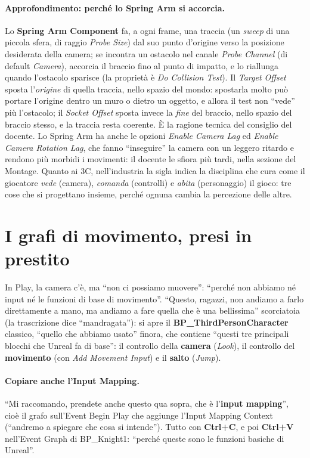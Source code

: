 \paragraph{Approfondimento: perché lo Spring Arm si accorcia.} Lo \textbf{Spring Arm
Component} fa, a ogni frame, una traccia (un \emph{sweep} di una piccola sfera, di
raggio \emph{Probe Size}) dal suo punto d'origine verso la posizione desiderata della
camera; se incontra un ostacolo nel canale \emph{Probe Channel} (di default
\emph{Camera}), accorcia il braccio fino al punto di impatto, e lo riallunga quando
l'ostacolo sparisce (la proprietà è \emph{Do Collision Test}). Il \emph{Target Offset}
sposta l'\emph{origine} di quella traccia, nello spazio del mondo: spostarla molto può
portare l'origine dentro un muro o dietro un oggetto, e allora il test non ``vede'' più
l'ostacolo; il \emph{Socket Offset} sposta invece la \emph{fine} del braccio, nello
spazio del braccio stesso, e la traccia resta coerente. È la ragione tecnica del
consiglio del docente. Lo Spring Arm ha anche le opzioni \emph{Enable Camera Lag} ed
\emph{Enable Camera Rotation Lag}, che fanno ``inseguire'' la camera con un leggero
ritardo e rendono più morbidi i movimenti: il docente le sfiora più tardi, nella sezione
del Montage. Quanto ai 3C, nell'industria la sigla indica la disciplina che cura come il
giocatore \emph{vede} (camera), \emph{comanda} (controlli) e \emph{abita} (personaggio)
il gioco: tre cose che si progettano insieme, perché ognuna cambia la percezione delle
altre.

\section{I grafi di movimento, presi in prestito}
\label{ue9:sec:movimento}

In Play, la camera c'è, ma ``non ci possiamo muovere'': ``perché non abbiamo né input né
le funzioni di base di movimento''. ``Questo, ragazzi, non andiamo a farlo direttamente a
mano, ma andiamo a fare quella che è una bellissima'' scorciatoia (la trascrizione dice
``mandragata''): si apre il \textbf{BP\_ThirdPersonCharacter} classico, ``quello che
abbiamo usato'' finora, che contiene ``questi tre principali blocchi che Unreal fa di
base'': il controllo della \textbf{camera} (\emph{Look}), il controllo del
\textbf{movimento} (con \emph{Add Movement Input}) e il \textbf{salto} (\emph{Jump}).

\paragraph{Copiare anche l'Input Mapping.} ``Mi raccomando, prendete anche questo qua
sopra, che è l'\textbf{input mapping}'', cioè il grafo sull'Event Begin Play che aggiunge
l'Input Mapping Context (``andremo a spiegare che cosa si intende''). Tutto con
\textbf{Ctrl+C}, e poi \textbf{Ctrl+V} nell'Event Graph di BP\_Knight1: ``perché queste
sono le funzioni basiche di Unreal''.

